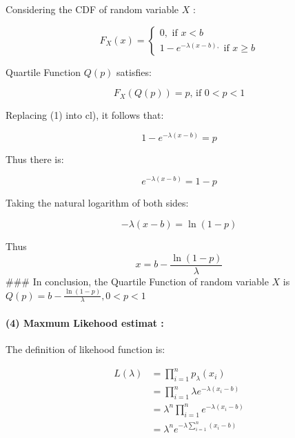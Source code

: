 \documentclass[
]{article}
\begin{document}
Considering the CDF of random variable \(X\) :

\[
F_{X}(x)=\left\{\begin{array}{l}
0, \text { if } x<b  \tag{1}\\
1-e^{-\lambda(x-b),} \text { if } x \geqslant b
\end{array}\right.
\]

Quartile Function \(Q(p)\) satisfies:

\[
\begin{equation}
F_{X}(Q(p))=p \text {, if } 0<p<1 \tag{2}
\end{equation}
\]

Replacing (1) into cl), it follows that:

\[
\begin{equation}
1-e^{-\lambda(x-b)}=p \tag{3}
\end{equation}
\]

Thus there is:

\[
\begin{equation}
e^{-\lambda(x-b)}=1-p \tag{4}
\end{equation}
\]

Taking the natural logarithm of both sides:

\[
\begin{equation}
-\lambda(x-b)=\ln (1-p) \tag{5}
\end{equation}
\]

Thus \[
\begin{equation}
x=b-\frac{\ln (1-p)}{\lambda} \tag{6}
\end{equation}
\] \#\#\# In conclusion, the Quartile Function of random variable \(X\)
is \(Q(p)=b-\frac{\ln (1-p)}{\lambda}, 0<p<1\)

\paragraph{\texorpdfstring{(4) Maxmum Likehood estimat
\MLE:}{(4) Maxmum Likehood estimat :}}\label{maxmum-likehood-estimat}

The definition of likehood function is:

\[
\begin{align*}
L(\lambda) & =\prod_{i=1}^{n} p_{\lambda}\left(x_{i}\right) \\
& =\prod_{i=1}^{n} \lambda e^{-\lambda\left(x_{i}-b\right)} \\
& =\lambda^{n} \prod_{i=1}^{n} e^{-\lambda\left(x_{i}-b\right)} \\
& =\lambda^{n} e^{-\lambda \sum_{i=1}^{n}\left(x_{i}-b\right)} \tag{1}
\end{align*}
\]
\end{document}
